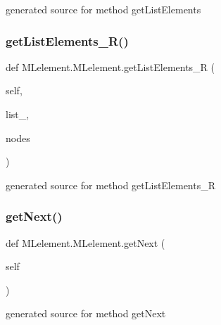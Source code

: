 \begin{DoxyVerb}generated source for method getListElements \end{DoxyVerb}
 \hypertarget{class_m_lelement_1_1_m_lelement_ae189cb2ff22dbd868ff104647852d8c1}{}\label{class_m_lelement_1_1_m_lelement_ae189cb2ff22dbd868ff104647852d8c1} 
\subsubsection{\texorpdfstring{get\+List\+Elements\+\_\+\+R()}{getListElements\_R()}}
{\footnotesize\ttfamily def M\+Lelement.\+M\+Lelement.\+get\+List\+Elements\+\_\+R (\begin{DoxyParamCaption}\item[{}]{self,  }\item[{}]{list\+\_\+,  }\item[{}]{nodes }\end{DoxyParamCaption})}

\begin{DoxyVerb}generated source for method getListElements_R \end{DoxyVerb}
 \hypertarget{class_m_lelement_1_1_m_lelement_af9b63925595587439f941da816b59e49}{}\label{class_m_lelement_1_1_m_lelement_af9b63925595587439f941da816b59e49} 
\subsubsection{\texorpdfstring{get\+Next()}{getNext()}}
{\footnotesize\ttfamily def M\+Lelement.\+M\+Lelement.\+get\+Next (\begin{DoxyParamCaption}\item[{}]{self }\end{DoxyParamCaption})}

\begin{DoxyVerb}generated source for method getNext \end{DoxyVerb}
 \hypertarget{class_m_lelement_1_1_m_lelement_a9372242ef8c51e4ab6f792e90a1eeab4}{}\label{class_m_lelement_1_1_m_lelement_a9372242ef8c51e4ab6f792e90a1eeab4} 
